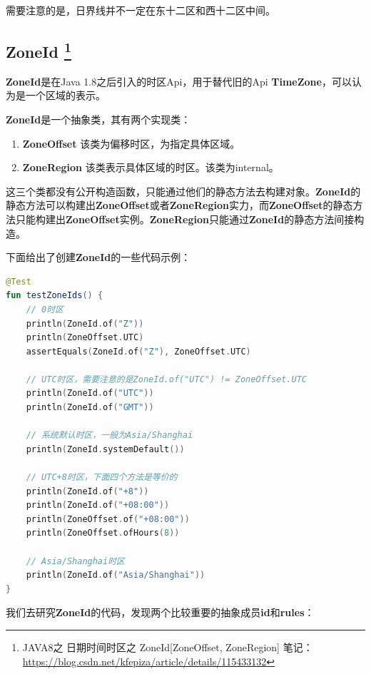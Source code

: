 \documentclass[cn,10pt,math=newtx,citestyle=gb7714-2015,bibstyle=gb7714-2015]{elegantbook}
\begin{document}
    \begin{note}
        需要注意的是，日界线并不一定在东十二区和西十二区中间。
    \end{note}

    \subsection{ZoneId
        \footnote{
            JAVA8之 日期时间时区之 ZoneId[ZoneOffset, ZoneRegion] 笔记：\url{https://blog.csdn.net/kfepiza/article/details/115433132}
        }
    }

    \textbf{ZoneId}是在Java 1.8之后引入的时区Api，用于替代旧的Api \textbf{TimeZone}，可以认为是一个区域的表示。

    \textbf{ZoneId}是一个抽象类，其有两个实现类：
    \begin{enumerate}
        \item \textbf{ZoneOffset} 该类为偏移时区，为指定具体区域。
        \item \textbf{ZoneRegion} 该类表示具体区域的时区。该类为internal。
    \end{enumerate}

    这三个类都没有公开构造函数，只能通过他们的静态方法去构建对象。\textbf{ZoneId}的静态方法可以构建出\textbf{ZoneOffset}或者\textbf{ZoneRegion}实力，而\textbf{ZoneOffset}的静态方法只能构建出\textbf{ZoneOffset}实例。\textbf{ZoneRegion}只能通过\textbf{ZoneId}的静态方法间接构造。

    下面给出了创建\textbf{ZoneId}的一些代码示例：

    \begin{lstlisting}[language=Kotlin]
@Test
fun testZoneIds() {
    // 0时区
    println(ZoneId.of("Z"))
    println(ZoneOffset.UTC)
    assertEquals(ZoneId.of("Z"), ZoneOffset.UTC)

    // UTC时区，需要注意的是ZoneId.of("UTC") != ZoneOffset.UTC
    println(ZoneId.of("UTC"))
    println(ZoneId.of("GMT"))
    
    // 系统默认时区，一般为Asia/Shanghai
    println(ZoneId.systemDefault())

    // UTC+8时区，下面四个方法是等价的
    println(ZoneId.of("+8"))
    println(ZoneId.of("+08:00"))
    println(ZoneOffset.of("+08:00"))
    println(ZoneOffset.ofHours(8))

    // Asia/Shanghai时区
    println(ZoneId.of("Asia/Shanghai"))
}
    \end{lstlisting}

    我们去研究\textbf{ZoneId}的代码，发现两个比较重要的抽象成员\textbf{id}和\textbf{rules}：
\end{document}
